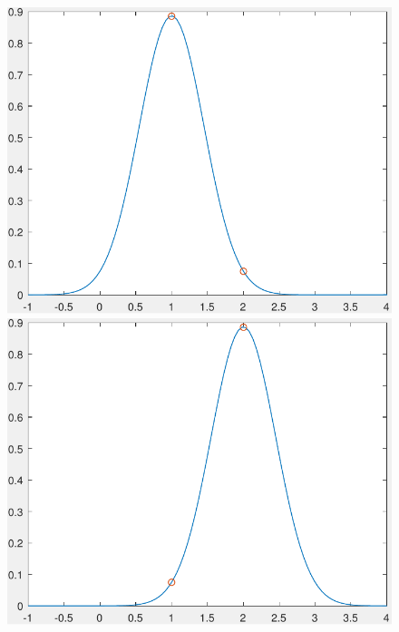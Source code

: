 \begin{figure}[ht]
\begin{minipage}[b]{0.3\linewidth}
			\end{minipage}
			\begin{minipage}[b]{0.3\linewidth}
				\includegraphics[width=\textwidth]{GammaTraceDensity01}
			\end{minipage}
			\begin{minipage}[b]{0.3\linewidth}
				\includegraphics[width=\textwidth]{GammaTraceDensity02}
			\end{minipage}
			\begin{minipage}[b]{0.3\linewidth}

\end{minipage}
\end{figure}
